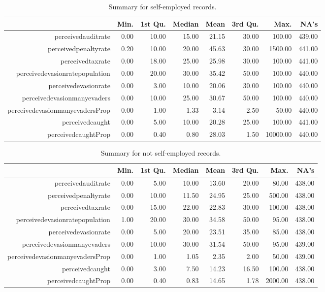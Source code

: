 \begin{table}[ht]
\footnotesize
\centering
\begin{tabular}{rrrrrrrr}
  \hline
 & Min. & 1st Qu. & Median & Mean & 3rd Qu. & Max. & NA's \\ 
  \hline
perceivedauditrate & 0.00 & 10.00 & 15.00 & 21.15 & 30.00 & 100.00 & 439.00 \\ 
  perceivedpenaltyrate & 0.20 & 10.00 & 20.00 & 45.63 & 30.00 & 1500.00 & 441.00 \\ 
  perceivedtaxrate & 0.00 & 18.00 & 25.00 & 25.98 & 30.00 & 100.00 & 441.00 \\ 
  perceivedevasionratepopulation & 0.00 & 20.00 & 30.00 & 35.42 & 50.00 & 100.00 & 440.00 \\ 
  perceivedevasionrate & 0.00 & 3.00 & 10.00 & 20.06 & 30.00 & 100.00 & 440.00 \\ 
  perceivedevasionmanyevaders & 0.00 & 10.00 & 25.00 & 30.67 & 50.00 & 100.00 & 440.00 \\ 
  perceivedevasionmanyevadersProp & 0.00 & 1.00 & 1.33 & 3.14 & 2.50 & 50.00 & 440.00 \\ 
  perceivedcaught & 0.00 & 5.00 & 10.00 & 20.28 & 25.00 & 100.00 & 441.00 \\ 
  perceivedcaughtProp & 0.00 & 0.40 & 0.80 & 28.03 & 1.50 & 10000.00 & 440.00 \\ 
   \hline
\end{tabular}
\caption{\label{tab:perceptions_summary_selfemployed} Summary for  self-employed records.}
\end{table}

\begin{table}[ht]
\footnotesize
\centering
\begin{tabular}{rrrrrrrr}
  \hline
 & Min. & 1st Qu. & Median & Mean & 3rd Qu. & Max. & NA's \\ 
  \hline
perceivedauditrate & 0.00 & 5.00 & 10.00 & 13.60 & 20.00 & 80.00 & 438.00 \\ 
  perceivedpenaltyrate & 0.00 & 10.00 & 11.50 & 24.95 & 25.00 & 500.00 & 438.00 \\ 
  perceivedtaxrate & 0.00 & 15.00 & 22.00 & 22.83 & 30.00 & 100.00 & 438.00 \\ 
  perceivedevasionratepopulation & 1.00 & 20.00 & 30.00 & 34.58 & 50.00 & 95.00 & 438.00 \\ 
  perceivedevasionrate & 0.00 & 5.00 & 20.00 & 23.51 & 35.00 & 85.00 & 438.00 \\ 
  perceivedevasionmanyevaders & 0.00 & 10.00 & 30.00 & 31.54 & 50.00 & 95.00 & 439.00 \\ 
  perceivedevasionmanyevadersProp & 0.00 & 1.00 & 1.05 & 2.35 & 2.00 & 50.00 & 439.00 \\ 
  perceivedcaught & 0.00 & 3.00 & 7.50 & 14.23 & 16.50 & 100.00 & 438.00 \\ 
  perceivedcaughtProp & 0.00 & 0.40 & 0.83 & 14.65 & 1.78 & 2000.00 & 438.00 \\ 
   \hline
\end{tabular}
\caption{\label{tab:perceptions_summary_notselfemployed} Summary for  not self-employed records.}
\end{table}


